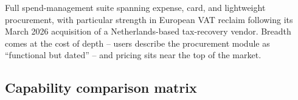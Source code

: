 \begin{center}
\begin{minipage}[t]{0.75\linewidth}
\begin{tcolorbox}[notebox, title={\faGlobe\ Meridian}]
\footnotesize
Full spend-management suite spanning expense, card, and lightweight procurement, with
particular strength in European VAT reclaim following its March 2026 acquisition of a
Netherlands-based tax-recovery vendor. Breadth comes at the cost of depth -- users describe the
procurement module as ``functional but dated'' -- and pricing sits near the top of the market.
\end{tcolorbox}
\end{minipage}
\end{center}

\subsection{Capability comparison matrix}

